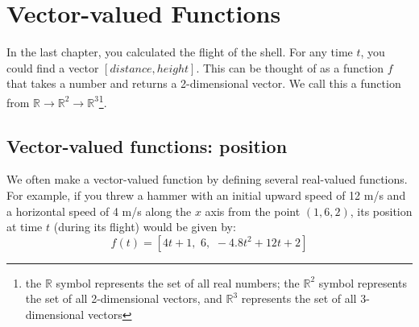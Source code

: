 \chapter{Vector-valued Functions}
In the last chapter, you calculated the flight of the shell.  For any
time $t$, you could find a vector $[distance, height]$. This can be
thought of as a function $f$ that takes a number and returns a
2-dimensional vector.  We call this a  function
from $\mathbb{R} \rightarrow \mathbb{R}^2 \rightarrow \mathbb{R}^3$\footnote{the $\mathbb{R}$ symbol represents the
set of all real numbers; the $\mathbb{R}^2$ symbol represents the set of all 2-dimensional vectors, and $\mathbb{R}^3$ represents the set of all 3-dimensional vectors}.
\section{Vector-valued functions: position}
We often make a vector-valued function by defining several real-valued
functions. For example, if you threw a hammer with an initial upward
speed of 12 m/s and a horizontal speed of 4 m/s along the $x$ axis from
the point $(1, 6, 2)$, its position at time $t$ (during its flight) would be given by:
$$f(t) = [4t + 1, \,\, 6, \,\, -4.8t^2 + 12t + 2]$$

